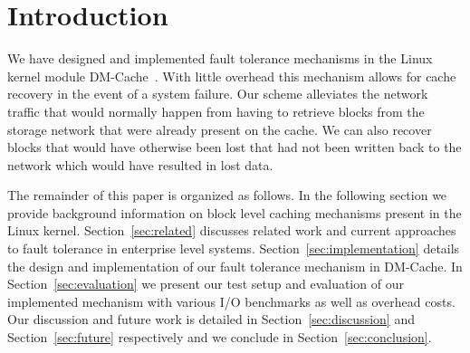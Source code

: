 \section{Introduction}

We have designed and implemented fault tolerance mechanisms in the
Linux kernel module DM-Cache~\cite{DM-Cache}. With little overhead
this mechanism allows for cache recovery in the event of a system
failure. Our scheme alleviates the network traffic that would normally
happen from having to retrieve blocks from the storage network that
were already present on the cache. We can also recover blocks that
would have otherwise been lost that had not been written back to the
network which would have resulted in lost data.

The remainder of this paper is organized as follows. In the following
section we provide background information on block level caching
mechanisms present in the Linux kernel. Section~\ref{sec:related}
discusses related work and current approaches to fault tolerance in
enterprise level systems. Section~\ref{sec:implementation} details the
design and implementation of our fault tolerance mechanism in
DM-Cache. In Section~\ref{sec:evaluation} we present our test setup
and evaluation of our implemented mechanism with various I/O
benchmarks as well as overhead costs. Our discussion and future work
is detailed in Section~\ref{sec:discussion} and
Section~\ref{sec:future} respectively and we conclude in
Section~\ref{sec:conclusion}.

